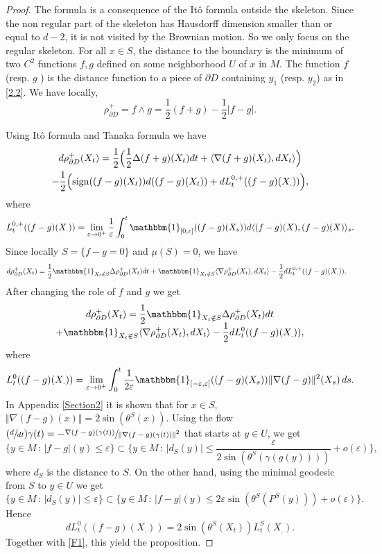 \documentclass[JEP,XML,SOM,Unicode,NoFloatCountersInSection,published]{cedram}
\newcommand{\Psfrac}[2]{(\sfrac{#1}{#2})}
\theoremstyle{plain}
\theoremstyle{definition}
\newcommand{\sign}{\mathrm{sign}}
\newcommand{\st}{\,:\,}
\newcommand{\un}{\mathbbm{1}}
\let\D\Delta
\let\e\varepsilon
\let\n\nabla
\begin{document}
\begin{proof}
The formula is a consequence of the Itô formula outside the skeleton.
Since the non regular part of the skeleton has Hausdorff dimension smaller than or equal to $d-2$, it is not visited by the Brownian motion. So we only focus on the regular skeleton. For all $x \in S$, the distance to the boundary is the minimum of two $C^2$ functions $ f,g$ defined on some neighborhood $U$ of $ x$ in $M$. The function $f$ (resp. $g$ ) is the distance function to a piece of $\partial D $ containing $y_1 $ (resp. $ y_2$) as in \eqref{2.2}.
We have locally,
\[
\rho^{+}_{\partial D} = f \wedge g = \frac12 (f +g ) -\frac12 \vert f-g \vert.
\]

Using Itô formula and Tanaka formula we have
\begin{multline*}
d\rho^{+}_{\partial D}(X_t) = \frac12 \Big(\frac12 \D (f+g)(X_t) dt +\langle \n (f+g) (X_t), dX_t \rangle \Big)\\
- \frac12 \Bigl(\sign ((f-g)(X_t))d((f-g)(X_t)) + dL^{0,+}_t((f-g)(X_.))\Bigr),
\end{multline*}
where
\[
L^{0,+}_t((f-g)(X_.))= \lim_{\e \to 0^+} \frac{1}{\e}\int_0^t \un_{[0,\e]} ((f-g)(X_s)) d\langle (f-g)(X),(f-g)(X) \rangle_s.
\]
Since locally $S = \{f-g =0 \}$ and $ \mu(S)=0$, we have
\begin{align*}
d\rho^{+}_{\partial D}(X_t) &= \frac12 \un_{X_t \notin S} \D \rho^{+}_{\partial D}(X_t) dt + \un_{X_t \notin S} \langle \n\rho^{+}_{\partial D}(X_t), dX_t \rangle -\frac12 dL^{0,+}_t((f-g)(X_.)).
\end{align*}
After changing the role of $ f$ and $g$ we get
\begin{multline}\label{F1}
d\rho^{+}_{\partial D}(X_t) = \frac12 \un_{X_t \notin S} \D \rho^{+}_{\partial D}(X_t) dt\\[-5pt]
+ \un_{X_t \notin S} \langle \n\rho^{+}_{\partial D}(X_t), dX_t \rangle -\frac12 dL^{0}_t((f-g)(X_.)),
\end{multline}
where
\[
L^{0}_t((f-g)(X_.))= \lim_{\e \to 0^+} \int_0^t\frac{1}{2\e} \un_{[-\e,\e]} ((f-g)(X_s)) \Vert \n (f-g)\Vert^2 (X_s)\, ds.
\]
In Appendix \ref{Section2} it is shown that for $x \in S$, $\Vert \n (f-g)(x) \Vert = 2 \sin\left(\theta^{S}(x)\right) $.
Using the flow $ \Psfrac{d}{dt} \gamma(t) = - \sfrac{\n (f-g)(\gamma(t))}{\Vert \n (f-g)(\gamma(t))\Vert^2} $ that starts at $y\in U$, we get
\[
\{y \in M\st \vert f-g \vert(y) \le \e \} \subset \{y \in M\st \vert d_S(y) \vert \le \frac{\e}{2\sin\left(\theta^{S}(\gamma(g(y)))\right)} + o(\e)\},
\]
where $d_{S}$ is the distance to $ S$.
On the other hand, using the minimal geodesic from $S$ to $y \in U$
we get
\[
\{y \in M\st \vert d_S(y) \vert \le \e \} \subset \bigl\{y \in M\st \vert f-g \vert(y) \le 2 \e \sin\left(\theta^{S}(P^S(y))\right) + o(\e)\bigr\}.
\]
Hence
\[
dL^{0}_t((f-g)(X_.)) = 2\sin\left(\theta^{S}(X_t)\right) L_t^S(X_.).
\]
Together with \eqref{F1}, this yield the proposition.
\end{proof}
\end{document}
